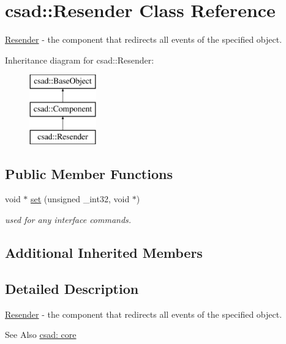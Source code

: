 \hypertarget{classcsad_1_1_resender}{\section{csad\-:\-:Resender Class Reference}
\label{classcsad_1_1_resender}
}


\hyperlink{classcsad_1_1_resender}{Resender} -\/ the component that redirects all events of the specified object.  


Inheritance diagram for csad\-:\-:Resender\-:\begin{figure}[H]
\begin{center}
\leavevmode
\includegraphics[height=3.000000cm]{classcsad_1_1_resender}
\end{center}
\end{figure}
\subsection*{Public Member Functions}
\begin{DoxyCompactItemize}
\item 
\hypertarget{classcsad_1_1_resender_a5e11724057ba72f430ffe8c630f23ec1}{void $\ast$ \hyperlink{classcsad_1_1_resender_a5e11724057ba72f430ffe8c630f23ec1}{set} (unsigned \-\_\-int32, void $\ast$)}\label{classcsad_1_1_resender_a5e11724057ba72f430ffe8c630f23ec1}

\begin{DoxyCompactList}\small\item\em used for any interface commands. \end{DoxyCompactList}\end{DoxyCompactItemize}
\subsection*{Additional Inherited Members}


\subsection{Detailed Description}
\hyperlink{classcsad_1_1_resender}{Resender} -\/ the component that redirects all events of the specified object. 

\begin{DoxySeeAlso}{See Also}
\hyperlink{group__core}{csad\-: core} 
\end{DoxySeeAlso}
